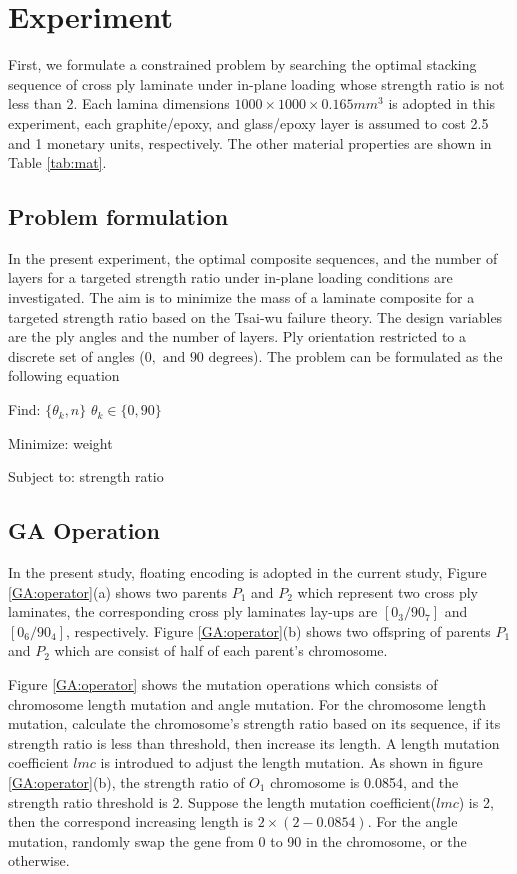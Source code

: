 \section{Experiment}
First, we formulate a constrained problem by searching the optimal stacking
sequence of cross ply laminate under in-plane loading whose strength ratio is
not less than 2.  Each lamina dimensions $1000 \times 1000 \times 0.165 mm^3$
is adopted in this experiment, each graphite/epoxy,  and glass/epoxy layer is
assumed to cost 2.5 and 1 monetary units, respectively. The other material
properties are shown in Table \ref{tab:mat}. 


\subsection{Problem formulation}

In the present experiment, the optimal composite sequences, and the number of
layers for a targeted strength ratio under in-plane loading conditions are
investigated.  The aim is to minimize the mass of a laminate composite for a
targeted strength ratio based on the Tsai-wu failure theory. The design
variables are the ply angles and the number of layers.  Ply orientation
restricted to a discrete set of angles ($0, \text{ and } 90 \text{ degrees} $).
The problem can be formulated as the following equation

Find: $\{\theta_k, n\}$ $\theta_k \in \{ 0,90\}$

Minimize: weight

Subject to: strength ratio


\subsection{GA Operation}


In the present study, floating encoding is adopted in the current study, Figure
\ref{GA:operator}(a) shows two parents $P_1$ and $P_2$ which represent two
cross ply laminates, the corresponding cross ply laminates lay-ups are
$[0_3/90_7]$ and $[0_6/90_4]$, respectively. Figure \ref{GA:operator}(b) shows
two offspring of parents $P_1$ and $P_2$ which are consist of half of each
parent's chromosome.

Figure \ref{GA:operator} shows the mutation operations which consists of
chromosome length mutation and angle mutation. For the chromosome length
mutation, calculate the chromosome's strength ratio based on its sequence, if
its strength ratio is less than threshold, then increase its length. A length
mutation coefficient $lmc$ is introdued to adjust the length mutation.  As
shown in figure \ref{GA:operator}(b), the strength ratio of $O_1$ chromosome is
0.0854, and the strength ratio threshold is 2. Suppose the length mutation
coefficient($lmc$) is 2, then the correspond increasing length is $2
\times(2-0.0854)$. For the angle mutation, randomly swap the gene from
0 to 90 in the chromosome, or the otherwise.


